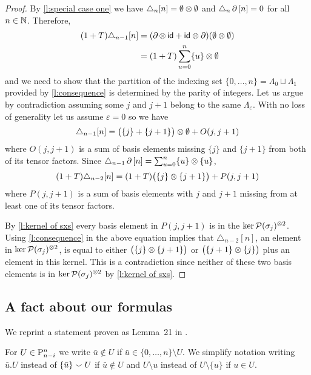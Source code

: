 \begin{proof}
	By \cref{l:special case one} we have $\triangle_{n} [n] = \emptyset \ot \emptyset$ and $\triangle_{n} \bd \, [n] = 0$ for all $n \in \N$.
	Therefore,
	\begin{align*}
	(1+T) \triangle_{n-1} [n] &=
	(\bd \ot \, \id + \id \ot \bd) (\emptyset \ot \emptyset) \\ &=
	(1+T) \sum_{u=0}^n \{u\} \ot \emptyset
	\end{align*}
	and we need to show that the partition of the indexing set $\{0, \dots, n\} = \Lambda_0 \sqcup \Lambda_1$ provided by \cref{l:consequence} is determined by the parity of integers.
	Let us argue by contradiction assuming some $j$ and $j+1$ belong to the same $\Lambda_{\varepsilon}$.
	With no loss of generality let us assume $\varepsilon = 0$ so we have
	\[
	\triangle_{n-1} [n] = \big( \{j\} + \{j+1\} \big) \ot \emptyset + O(j, j+1)
	\]
	where $O(j, j+1)$ is a sum of basis elements missing $\{j\}$ and $\{j+1\}$ from both of its tensor factors.
	Since $\triangle_{n-1} \bd \, [n] = \sum_{u=0}^{n} \{u\} \ot \{u\}$,
	\[
	(1+T) \triangle_{n-2} [n] = (1+T) \big( \{j\} \ot \{j+1\} \big) + P(j, j+1)
	\]
	where $P(j, j+1)$ is a sum of basis elements with $j$ and $j+1$ missing from at least one of its tensor factors.

	By \cref{l:kernel of sxs} every basis element in $P(j,j+1)$ is in the $\ker \cP(\sigma_j)^{\ot 2}$.
	Using \cref{l:consequence} in the above equation implies that $\triangle_{n-2} [n]$, an element in $\ker \cP(\sigma_j)^{\ot 2}$, is equal to either $\big( \{j\} \ot \{j+1\} \big)$ or $\big( \{j+1\} \ot \{j\} \big)$ plus an element in this kernel.
	This is a contradiction since neither of these two basis elements is in $\ker \cP(\sigma_j)^{\ot 2}$ by \cref{l:kernel of sxs}.
\end{proof}

\subsection{A fact about our formulas} \label{ss:fact}

We reprint a statement proven as Lemma~21 in \cite{medina2021fast_sq}.

\begin{notation*}
	For $U \in \P_{n-i}^n$ we write $\bar u \notin U$ if $\bar u \in \{0, \dots, n\} \setminus U$.
	We simplify notation writing $\bar u.U$ instead of $\{\bar u\} \union U$ if $\bar u \notin U$ and $U \setminus u$ instead of $U \setminus \{u\}$ if $u \in U$.
\end{notation*}

